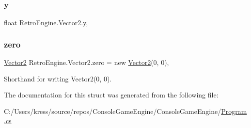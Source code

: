 \mbox{\label{struct_retro_engine_1_1_vector2_aae2478fc8e97af99443c2ad746050ee3}} 
\subsubsection{\texorpdfstring{y}{y}}
{\footnotesize\ttfamily float Retro\+Engine.\+Vector2.\+y\hspace{0.3cm}{\ttfamily [get]}, {\ttfamily [set]}}

\mbox{\label{struct_retro_engine_1_1_vector2_a1a2b5353a4fcbe21919adb539a8f9784}} 
\subsubsection{\texorpdfstring{zero}{zero}}
{\footnotesize\ttfamily \mbox{\hyperlink{struct_retro_engine_1_1_vector2}{Vector2}} Retro\+Engine.\+Vector2.\+zero = new \mbox{\hyperlink{struct_retro_engine_1_1_vector2}{Vector2}}(0, 0)\hspace{0.3cm}{\ttfamily [static]}, {\ttfamily [get]}}



Shorthand for writing Vector2(0, 0). 



The documentation for this struct was generated from the following file\+:\begin{DoxyCompactItemize}
\item 
C\+:/\+Users/kress/source/repos/\+Console\+Game\+Engine/\+Console\+Game\+Engine/\mbox{\hyperlink{_program_8cs}{Program.\+cs}}\end{DoxyCompactItemize}
